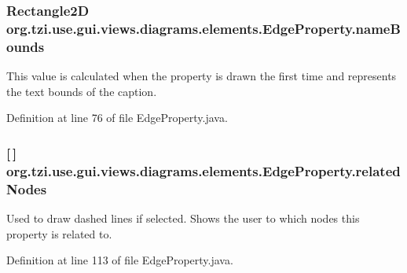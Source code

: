 \hypertarget{classorg_1_1tzi_1_1use_1_1gui_1_1views_1_1diagrams_1_1elements_1_1_edge_property_a2d4f3a6543ff34e2649abf32532761c8}{
\subsubsection[{name\-Bounds}]{\setlength{\rightskip}{0pt plus 5cm}Rectangle2\-D org.\-tzi.\-use.\-gui.\-views.\-diagrams.\-elements.\-Edge\-Property.\-name\-Bounds\hspace{0.3cm}{\ttfamily [protected]}}}\label{classorg_1_1tzi_1_1use_1_1gui_1_1views_1_1diagrams_1_1elements_1_1_edge_property_a2d4f3a6543ff34e2649abf32532761c8}
This value is calculated when the property is drawn the first time and represents the text bounds of the caption. 

Definition at line 76 of file Edge\-Property.\-java.

\hypertarget{classorg_1_1tzi_1_1use_1_1gui_1_1views_1_1diagrams_1_1elements_1_1_edge_property_a9d2b1f0f113e942b43fbc4e1407d51fb}{
\subsubsection[{related\-Nodes}]{ \mbox{[}$\,$\mbox{]} org.\-tzi.\-use.\-gui.\-views.\-diagrams.\-elements.\-Edge\-Property.\-related\-Nodes\hspace{0.3cm}{\ttfamily [protected]}}}\label{classorg_1_1tzi_1_1use_1_1gui_1_1views_1_1diagrams_1_1elements_1_1_edge_property_a9d2b1f0f113e942b43fbc4e1407d51fb}
Used to draw dashed lines if selected. Shows the user to which nodes this property is related to. 

Definition at line 113 of file Edge\-Property.\-java.


